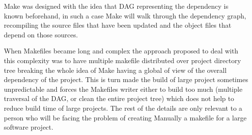 Make was designed with the idea that DAG representing the dependency is known beforehand, in such a case 
Make will walk through the dependency graph, recompiling the source files that have been updated and the object 
files that depend on those sources. 

When Makefiles became long and complex the approach proposed to deal with this complexity was to have multiple
makefile distributed over project directory tree breaking the whole idea of Make having a global of view of the
overall dependency of the project. This is turn made the build of large project sometimes unpredictable and 
forces the Makefiles writer either to build too much (multiple traversal of the DAG, or clean the entire project tree)
which does not help to reduce build time of large projects. The rest of the details are only relevant to a person 
who will be facing the problem of creating Manually a makefile for a large software project.

